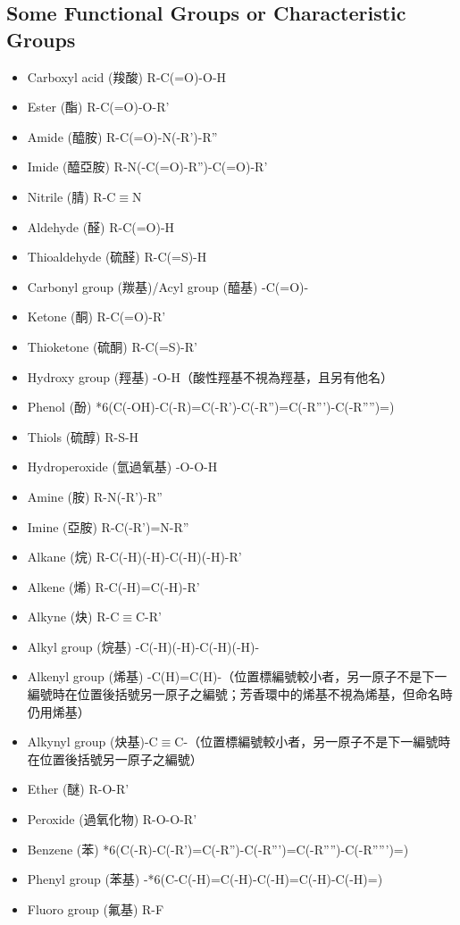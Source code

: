 \documentclass[a4paper,12pt]{report}
\begin{document}
\subsection{Some Functional Groups or Characteristic Groups}
\begin{itemize}
\item Carboxyl acid (羧酸) R-C(=O)-O-H
\item Ester (酯) R-C(=O)-O-R'
\item Amide (醯胺) R-C(=O)-N(-R')-R''
\item Imide (醯亞胺) R-N(-C(=O)-R'')-C(=O)-R'
\item Nitrile (腈) R-C$\equiv$N
\item Aldehyde (醛) R-C(=O)-H
\item Thioaldehyde (硫醛) R-C(=S)-H
\item Carbonyl group (羰基)/Acyl group (醯基) -C(=O)-
\item Ketone (酮) R-C(=O)-R'
\item Thioketone (硫酮) R-C(=S)-R'
\item Hydroxy group (羥基) -O-H（酸性羥基不視為羥基，且另有他名）
\item Phenol (酚) *6(C(-OH)-C(-R)=C(-R')-C(-R'')=C(-R''')-C(-R'''')=)
\item Thiols (硫醇) R-S-H
\item Hydroperoxide (氫過氧基) -O-O-H
\item Amine (胺) R-N(-R')-R''
\item Imine (亞胺) R-C(-R')=N-R''
\item Alkane (烷) R-C(-H)(-H)-C(-H)(-H)-R'
\item Alkene (烯) R-C(-H)=C(-H)-R'
\item Alkyne (炔) R-C$\equiv$C-R'
\item Alkyl group (烷基) -C(-H)(-H)-C(-H)(-H)-
\item Alkenyl group (烯基) -C(H)=C(H)-（位置標編號較小者，另一原子不是下一編號時在位置後括號另一原子之編號；芳香環中的烯基不視為烯基，但命名時仍用烯基）
\item Alkynyl group (炔基)-C$\equiv$C-（位置標編號較小者，另一原子不是下一編號時在位置後括號另一原子之編號）
\item Ether (醚) R-O-R'
\item Peroxide (過氧化物) R-O-O-R'
\item Benzene (苯) *6(C(-R)-C(-R')=C(-R'')-C(-R''')=C(-R'''')-C(-R''''')=)
\item Phenyl group (苯基) -*6(C-C(-H)=C(-H)-C(-H)=C(-H)-C(-H)=)
\item Fluoro group (氟基) R-F

\end{itemize}
\end{document}
